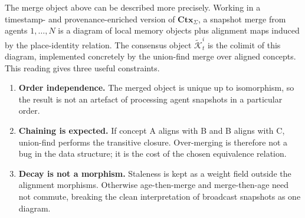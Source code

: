 \documentclass{article}
\begin{document}
The merge object above can be described more precisely. Working in a
timestamp- and provenance-enriched version of $\mathbf{Ctx}_\Sigma$, a
snapshot merge from agents $1,\dots,N$ is a diagram of local memory
objects plus alignment maps induced by the place-identity relation. The
consensus object $\widetilde{\mathcal{K}}_t^i$ is the colimit of this
diagram, implemented concretely by the union-find merge over aligned
concepts. This reading gives three useful constraints.
\begin{enumerate}[leftmargin=20pt,itemsep=2pt,topsep=2pt]
\item \textbf{Order independence.} The merged object is unique up to isomorphism, so the result is not an artefact of processing agent snapshots in a particular order.
\item \textbf{Chaining is expected.} If concept A aligns with B and B aligns with C, union-find performs the transitive closure. Over-merging is therefore not a bug in the data structure; it is the cost of the chosen equivalence relation.
\item \textbf{Decay is not a morphism.} Staleness is kept as a weight field outside the alignment morphisms. Otherwise age-then-merge and merge-then-age need not commute, breaking the clean interpretation of broadcast snapshots as one diagram.
\end{enumerate}
\end{document}
